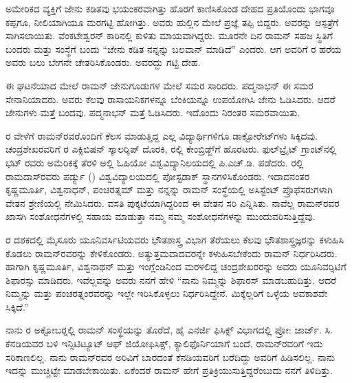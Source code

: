 ಅಮೇರಿಕದ ವ್ಯಕ್ತಿಗೆ ಜೇನು ಕಡಿತವು ಭಯಂಕರವಾಗಿತ್ತು ಹೊರಗೆ ಕಾಣಿಸಿಕೊಂಡ ದೇಹದ ಪ್ರತಿಯೊಂದು ಭಾಗವೂ ಕಪ್ಪಗೂ, ನೀಲಿಯಾಗಿಯೂ ಮರಗಟ್ಟಿ ಹೋಗಿತ್ತು. ಅವರು ಹುಲ್ಲಿನ ಮೇಲೆ ಪ್ರಜ್ಞೆ ತಪ್ಪಿ ಬಿದ್ದರು. ಅವರನ್ನು ಆಸ್ಪತ್ರೆಗೆ ಸಾಗಿಸಲಾಯಿತು. ವೆಂಕಟೇಶ್ವರನ್ ಕಾರಿನಲ್ಲಿ ಕುಳಿತು ಮಾಯವಾಗಿದ್ದರು. ಮೂರನೇ ದಿನ ರಾಮನ್ ಸಹಜ ಸ್ಥಿತಿಗೆ ಬಂದರು ಮತ್ತು ಸಂಸ್ಥೆಗೆ ಬಂದು “ಜೇನು ಕಡಿತ ನನ್ನನ್ನು ಬಲವಾನ್ ಮಾಡಿದೆ” ಎಂದರು. ಆಗ ಅವರಿಗೆ ರ ಹರೆಯ ಅವರು ಬಲು ಬೇಗನೇ ಚೇತರಿಸಿಕೊಂಡರು. ಅವರದ್ದು ಗಟ್ಟಿ ದೇಹ.

ಈ ಘಟನೆಯಾದ ಮೇಲೆ ರಾಮನ್ ಜೇನುಗೂಡುಗಳ ಮೇಲೆ ಸಮರ ಸಾರಿದರು. ಪದ್ಮನಾಭನ್ ಈ ಸಮರ ಸೇನಾನಿಯಾದರು. ಅವರು ಕೆಲವು ರಾಸಾಯನಿಕಗಳನ್ನೂ ಬೆಂಕಿಯನ್ನೂ ಉಪಯೋಗಿಸಿ ಜೇನು ಓಡಿಸಿದರು. ಆದರೆ ಜೇನುಗಳು ಮತ್ತೆ ಬಂದವು. ಪದ್ಮನಾಭನ್ ಮತ್ತೆ ಓಡಿಸಿದರು. ಇದೊಂದು ನಿರಂತರ ಸಮರವಾಯಿತು.



ರ ವೇಳೆಗೆ ರಾಮನ್‍ರವರೊಂದಿಗೆ ಕೆಲಸ ಮಾಡುತ್ತಿದ್ದ ಎಲ್ಲ ವಿದ್ಯಾರ್ಥಿಗಳಿಗೂ ಡಾಕ್ಟೋರೇಟ್‍ಗಳು ಸಿಕ್ಕಿದವು. ಚಂದ್ರಶೇಖರವರಿಗೆ ರ ಎಕ್ಸಿಬಿಷನ್ ಸ್ಕಾಲರ್‍ಶಿಪ್ ದೊರಕಿ, ರಲ್ಲಿ ಕೇಂಬ್ರಿಡ್ಜ್‌ಗೆ ಹೊರಟರು. ಫುಲ್‍ಬ್ರೈಟ್ ಗ್ರಾಂಟ್‍ನಲ್ಲಿ ಭಟ್ ರವರು ಅಮೆರಿಕಕ್ಕೆ ತೆರಳಿ ಅಲ್ಲಿ ಓಹಿಯೋ ವಿಶ್ವವಿದ್ಯಾನಿಲಯದಲ್ಲಿ ಪಿ.ಎಚ್.ಡಿ. ಪಡೆದರು. ರಲ್ಲಿ ರಾಮದಾಸ್‍ರವರು ಪರ್ಡ್ಯು () ವಿಶ್ವವಿದ್ಯಾಲಯದಲ್ಲಿ ಪೋಸ್ಟಡಾಕ್ ಸ್ಥಾನಗಳಿಸಿಕೊಂಡರು. ಇದಾದನಂತರ ಕೃಷ್ಣಮೂರ್ತಿ, ವಿಶ್ವನಾಧನ್, ಪಂಚರತ್ನಮ್ ಮತ್ತು ನನ್ನನ್ನು ರಾಮನ್ ಸಂಸ್ಥೆಯಲ್ಲಿ ಅಸಿಸ್ಟೆಂಟ್ ಪ್ರೊಫೆಸರುಗಳಾಗಿ  ವೇತನ ಶ್ರೇಣಿಯಲ್ಲಿ ನೇಮಿಸಿದರು. ವಸತಿ ಪುಕ್ಕಟೆಯಾಗಿದ್ದರಿಂದ ಈ ವೇತನ ಸರಿ ಎನ್ನಿಸಿತು. ನಾವೆಲ್ಲ ರಾಮನ್‍ರವರ ಖಾಸಗಿ ಸಂಶೋಧನೆಗಳಲ್ಲಿ ಸಹಾಯ ಮಾಡುತ್ತಾ ನಮ್ಮ ನಮ್ಮ ಸಂಶೋಧನೆಗಳನ್ನು ಮುಂದುವರಿಸುತ್ತಿದ್ದೆವು.

ರ ದಶಕದಲ್ಲಿ ಮೈಸೂರು ಯೂನಿವರ್ಸಿಟಿಯವರು ಭೌತಶಾಸ್ತ್ರ ವಿಭಾಗ ತೆರೆಯಲು ಕೆಲವು ಭೌತಶಾಸ್ತ್ರಜ್ಞರನ್ನು ಕಳುಹಿಸಿ ಕೊಡಲು ರಾಮನ್‍ರವರನ್ನು ಕೇಳಿಕೊಂಡರು. ಅತ್ಯುತ್ತಮವಾದವರನ್ನೇ ಕಳುಹಿಸಬೇಕೆಂದು ರಾಮನ್ ನಿರ್ಧರಿಸಿದರು. ಹಾಗಾಗಿ ಕೃಷ್ಣಮೂರ್ತಿ, ವಿಶ್ವನಾಥನ್ ಮತ್ತು ಇಂಗ್ಲೆಂಡಿನಿಂದ ಮರಳಲಿದ್ದ ಚಂದ್ರಶೇಖರರನ್ನು ಅವರು ಯೂನಿವರ್‍ಸಿಟಿಗೆ ಶಿಫಾರಸ್ಸು ಮಾಡಿದರು. ಇವೆಲ್ಲವನ್ನು ಅವರು ನನಗೆ ಹೇಳಿ “ನಾನು ನಿಮ್ಮನ್ನು ಶಿಫಾರಸ್ ಮಾಡಬಹುದಿತ್ತು. ಆದರೆ ನಿಮ್ಮನ್ನು ಮತ್ತು ಪಂಚರತ್ನಂರವರನ್ನು ಇಲ್ಲೇ ಇರಿಸಿಕೊಳ್ಳಲು ನಿರ್ಧರಿಸಿದ್ದೇನೆ. ಮಿಕ್ಕೆಲ್ಲರಿಗೆ ಒಳ್ಳೆಯ ಅವಕಾಶವೇ ಸಿಕ್ಕಿದೆ.”

ನಾನು ರ ಅಕ್ಟೋಬರ್‍ನಲ್ಲಿ ರಾಮನ್ ಸಂಸ್ಥೆಯನ್ನು ತೊರೆದೆ, ಹೈ ಎನರ್ಜಿ ಫಿಸಿಕ್ಸ್ ವಿಭಾಗದಲ್ಲಿ ಪ್ರೋ: ಜಾರ್ಜ್. ಸಿ. ಕೆನಡಿಯವರ ಬಳಿ ಇನ್ಸಿಟಿಟ್ಯೂಟ್ ಆಫ್ ಜಿಯೋಫಿಸಿಕ್ಸ್, ಕ್ಯಾಲಿಫೊರ್ನಿಯಾಗೆ ಬಂದೆ, ರಾಮನ್‍ರವರಿಗೆ ಇದು ಸರಿಕಾಣಲಿಲ್ಲ. ನಾನು ರಾಮನ್‍ರವರ ಅರಿವಿಗೆ ಬಾರದಂತೆ ಕೆನಡಿಯವರಿಗೆ ಬರೆದಿದ್ದು ಅವರಿಗೆ ಹಿಡಿಸಲಿಲ್ಲ. ನಾನು ಇದನ್ನು ಮುಚ್ಚಿಟ್ಟೇ ಮಾಡಬೇಕಾಯಿತು. ಏಕೆಂದರೆ ರಾಮನ್ ಹೇಗೆ ಪ್ರತಿಕ್ರಿಯುಸುತ್ತಿದ್ದರೆಂಬುದು ನನಗೆ ತಿಳಿದಿತ್ತು.

